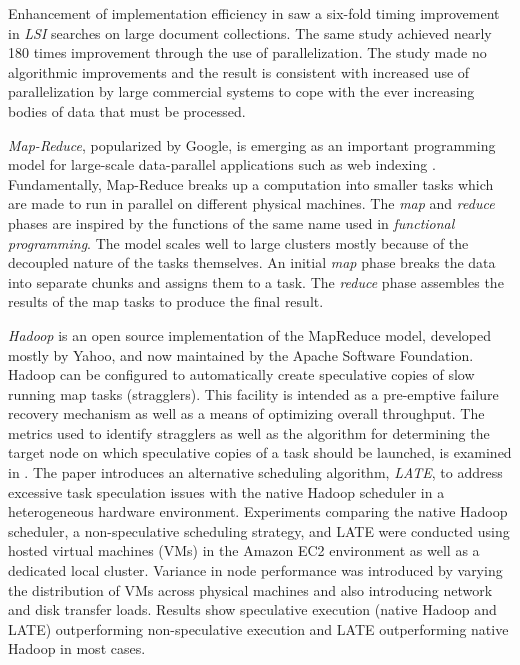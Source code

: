 \documentclass[10pt]{report}
\begin{document}
Enhancement of implementation efficiency in \cite{RefWorks:96} saw a
six-fold timing improvement in \textit{LSI} searches on large document
collections. The same study achieved nearly 180 times improvement
through the use of parallelization. The study made no algorithmic
improvements and the result is consistent with increased use of
parallelization by large commercial systems to cope with the ever
increasing bodies of data that must be processed.

\textit{Map-Reduce}, popularized by Google, is emerging as an
important programming model for large-scale data-parallel applications
such as web indexing \cite{RefWorks:113}. Fundamentally, Map-Reduce
breaks up a computation into smaller tasks which are made to run in
parallel on different physical machines. The \textit{map} and
\textit{reduce} phases are inspired by the functions of the same name
used in \textit{functional programming}. The model scales well to large
clusters mostly because of the decoupled nature of the tasks
themselves. An initial \textit{map} phase breaks the data into
  separate chunks and assigns them to a task. The \textit{reduce}
  phase assembles the results of the map tasks to produce the final
  result.

\textit{Hadoop} is an open source implementation of the MapReduce
model, developed mostly by Yahoo, and now maintained by the Apache
Software Foundation. Hadoop can be configured to automatically create
speculative copies of slow running map tasks
(stragglers). This facility is intended as a pre-emptive failure
recovery mechanism as well as a means of optimizing overall
throughput. The metrics used to identify stragglers as well as the
algorithm for determining the target node on which speculative copies
of a task should be launched, is examined in \cite{RefWorks:128}. The
paper introduces an alternative scheduling algorithm, \textit{LATE},
to address excessive task speculation issues with the native Hadoop
scheduler in a heterogeneous hardware environment. Experiments
comparing the native Hadoop scheduler, a non-speculative scheduling
strategy, and LATE were conducted using hosted virtual machines (VMs)
in the Amazon EC2 environment as well as a dedicated local
cluster. Variance in node performance was introduced by varying the
distribution of VMs across physical machines and also introducing
network and disk transfer loads. Results show speculative execution
(native Hadoop and LATE) outperforming non-speculative execution and
LATE outperforming native Hadoop in most cases.
\end{document}
